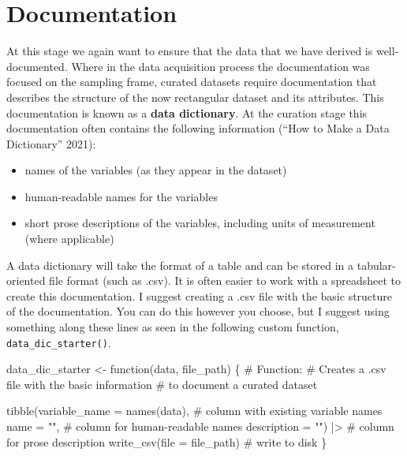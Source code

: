 \documentclass[
  letterpaper,
]{latex/krantz}
\newenvironment{Shaded}{\begin{snugshade}}{\end{snugshade}}
\newcommand{\AttributeTok}[1]{\textcolor[rgb]{0.40,0.45,0.13}{#1}}
\newcommand{\CommentTok}[1]{\textcolor[rgb]{0.37,0.37,0.37}{#1}}
\newcommand{\ControlFlowTok}[1]{\textcolor[rgb]{0.00,0.23,0.31}{#1}}
\newcommand{\FunctionTok}[1]{\textcolor[rgb]{0.28,0.35,0.67}{#1}}
\newcommand{\NormalTok}[1]{\textcolor[rgb]{0.00,0.23,0.31}{#1}}
\newcommand{\OtherTok}[1]{\textcolor[rgb]{0.00,0.23,0.31}{#1}}
\newcommand{\SpecialCharTok}[1]{\textcolor[rgb]{0.37,0.37,0.37}{#1}}
\newcommand{\StringTok}[1]{\textcolor[rgb]{0.13,0.47,0.30}{#1}}
\providecommand{\tightlist}{%
  \setlength{\itemsep}{0pt}\setlength{\parskip}{0pt}}\usepackage{longtable,booktabs,array}
\begin{document}
\hypertarget{documentation-2}{%
\section{Documentation}\label{documentation-2}}

At this stage we again want to ensure that the data that we have derived
is well-documented. Where in the data acquisition process the
documentation was focused on the sampling frame, curated datasets
require documentation that describes the structure of the now
rectangular dataset and its attributes. This documentation is known as a
\textbf{data dictionary}. At the curation stage this documentation often
contains the following information ({``How to Make a Data Dictionary''}
2021):

\begin{itemize}
\tightlist
\item
  names of the variables (as they appear in the dataset)
\item
  human-readable names for the variables
\item
  short prose descriptions of the variables, including units of
  measurement (where applicable)
\end{itemize}

A data dictionary will take the format of a table and can be stored in a
tabular-oriented file format (such as .csv). It is often easier to work
with a spreadsheet to create this documentation. I suggest creating a
.csv file with the basic structure of the documentation. You can do this
however you choose, but I suggest using something along these lines as
seen in the following custom function, \texttt{data\_dic\_starter()}.

\begin{Shaded}
\begin{Highlighting}[]
\NormalTok{data\_dic\_starter }\OtherTok{\textless{}{-}} \ControlFlowTok{function}\NormalTok{(data, file\_path) \{}
  \CommentTok{\# Function:}
  \CommentTok{\# Creates a .csv file with the basic information}
  \CommentTok{\# to document a curated dataset}
  
  \FunctionTok{tibble}\NormalTok{(}\AttributeTok{variable\_name =} \FunctionTok{names}\NormalTok{(data), }\CommentTok{\# column with existing variable names }
       \AttributeTok{name =} \StringTok{""}\NormalTok{, }\CommentTok{\# column for human{-}readable names}
       \AttributeTok{description =} \StringTok{""}\NormalTok{) }\SpecialCharTok{|\textgreater{}} \CommentTok{\# column for prose description}
  \FunctionTok{write\_csv}\NormalTok{(}\AttributeTok{file =}\NormalTok{ file\_path) }\CommentTok{\# write to disk}
\NormalTok{\}}
\end{Highlighting}
\end{Shaded}
\end{document}
